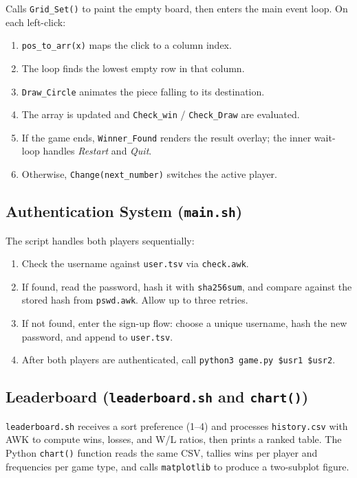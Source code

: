 \documentclass[12pt]{article}
\begin{document}
Calls \texttt{Grid\_Set()} to paint the empty board, then enters the main event loop. On each left-click:
\begin{enumerate}
    \item \texttt{pos\_to\_arr(x)} maps the click to a column index.
    \item The loop finds the lowest empty row in that column.
    \item \texttt{Draw\_Circle} animates the piece falling to its destination.
    \item The array is updated and \texttt{Check\_win} / \texttt{Check\_Draw} are evaluated.
    \item If the game ends, \texttt{Winner\_Found} renders the result overlay; the inner wait-loop handles \textit{Restart} and \textit{Quit}.
    \item Otherwise, \texttt{Change(next\_number)} switches the active player.
\end{enumerate}
 
\subsection{Authentication System (\texttt{main.sh})}
 
The script handles both players sequentially:
\begin{enumerate}
    \item Check the username against \texttt{user.tsv} via \texttt{check.awk}.
    \item If found, read the password, hash it with \texttt{sha256sum}, and compare against the stored hash from \texttt{pswd.awk}. Allow up to three retries.
    \item If not found, enter the sign-up flow: choose a unique username, hash the new password, and append to \texttt{user.tsv}.
    \item After both players are authenticated, call \texttt{python3 game.py \$usr1 \$usr2}.
\end{enumerate}
 
\subsection{Leaderboard (\texttt{leaderboard.sh} and \texttt{chart()})}
 
\texttt{leaderboard.sh} receives a sort preference (1--4) and processes \texttt{history.csv} with AWK to compute wins, losses, and W/L ratios, then prints a ranked table. The Python \texttt{chart()} function reads the same CSV, tallies wins per player and frequencies per game type, and calls \texttt{matplotlib} to produce a two-subplot figure.
 
\end{document}
